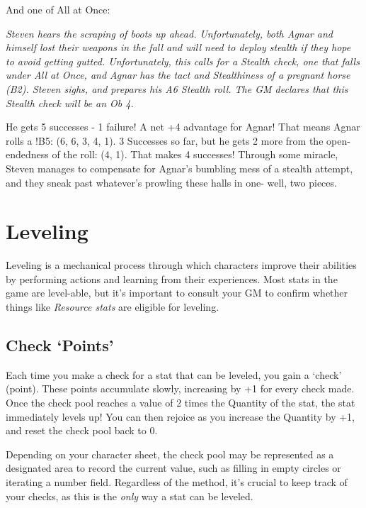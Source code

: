 \documentclass[../main.tex]{subfiles}
\begin{document}
        And one of All at Once:

        \begin{displayquote}
            {\em Steven hears the scraping of boots up ahead. Unfortunately, both Agnar and himself lost their weapons in the fall and will need to deploy stealth if they hope to avoid getting gutted. Unfortunately, this calls for a Stealth check, one that falls under All at Once, and Agnar has the tact and Stealthiness of a pregnant horse (B2). Steven sighs, and prepares his A6 Stealth roll. The GM declares that this Stealth check will be an Ob 4.
        
            He gets 5 successes - 1 failure! A net +4 advantage for Agnar! That means Agnar rolls a !B5: (6, 6, 3, 4, 1). 3 Successes so far, but he gets 2 more from the open-endedness of the roll: (4, 1). That makes 4 successes! Through some miracle, Steven manages to compensate for Agnar's bumbling mess of a stealth attempt, and they sneak past whatever's prowling these halls in one- well, two pieces.}
    \end{displayquote}

    \section{Leveling}

    Leveling is a mechanical process through which characters improve their abilities by performing actions and learning from their experiences. Most stats in the game are level-able, but it's important to consult your GM to confirm whether things like \emph{Resource stats} are eligible for leveling.

    \subsection{Check `Points'}

    Each time you make a check for a stat that can be leveled, you gain a `check' (point). These points accumulate slowly, increasing by +1 for every check made. Once the check pool reaches a value of 2 times the Quantity of the stat, the stat immediately levels up! You can then rejoice as you increase the Quantity by +1, and reset the check pool back to 0.

    Depending on your character sheet, the check pool may be represented as a designated area to record the current value, such as filling in empty circles or iterating a number field. Regardless of the method, it's crucial to keep track of your checks, as this is the \emph{only} way a stat can be leveled.
\end{document}
